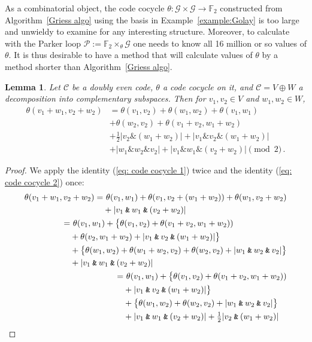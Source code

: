 \documentclass{article}
\theoremstyle{plain}
\newtheorem{lemma}{Lemma}
\theoremstyle{definition}
\def \cC {\mathcal{C}}
\def \cG {\mathcal{G}}
\def \cP {\mathcal{P}}
\def \FF {\mathbb{F}}
\newcommand{\AND}{\mathbin{\texttt{\&}}}
\def\And{\mathbin{\&}}
\def\Plus{+}
\begin{document}
As a combinatorial object, the code cocycle $\theta\colon \cG \times \cG\to \FF_2$ constructed from Algorithm~\ref{Griess algo} using the basis in Example~\ref{example:Golay} is too large and unwieldy to examine for any interesting structure. 
Moreover, to calculate with the Parker loop $\cP := \FF_2\times_\theta \cG$ one needs to know all 16 million or so values of $\theta$.
It is thus desirable to have a method that will calculate values of $\theta$ by a method shorter than Algorithm~\ref{Griess algo}.

\begin{lemma}\label{lemma:formula lemma}
Let $\cC$ be a doubly even code, $\theta$ a code cocycle on it, and $\cC = V\oplus W$ a decomposition into complementary subspaces.
Then for $v_1,v_2\in V$ and $w_1,w_2\in W$,
\begin{align}\label{eq:theformula}
	\theta(v_1\Plus w_1,v_2\Plus w_2)	
		& = \theta(v_1,v_2)  + \theta(w_1,w_2) + \theta(v_1,w_1) \\
		&+ \theta(w_2,v_2) + \theta(v_1\Plus v_2,w_1\Plus w_2) \nonumber \\
							& + \tfrac12|v_2\And(w_1\Plus w_2)| + |v_1\And v_2 \And (w_1\Plus w_2)| \nonumber \\
							&+|w_1\And w_2 \And v_2| + \left|v_1\And w_1 \And (v_2 \Plus  w_2)\right| \pmod 2\,. \nonumber
\end{align}
\end{lemma}

\begin{proof}
We apply the identity (\ref{eq: code cocycle 1}) twice and the identity (\ref{eq: code cocycle 2}) once:
\begin{align*}
\begin{split}
	\theta(v_1+w_1,v_2+w_2) =&\ \theta(v_1,w_1) + \theta(v_1,v_2+(w_1+w_2)) + \theta(w_1,v_2+w_2) \\
	&+ |v_1\AND w_1\AND(v_2+w_2)| 
\end{split}\\
\begin{split}
	 =&\ \theta(v_1,w_1) + \big\{ \theta(v_1,v_2) + \theta(v_1+v_2,w_1+w_2)) \\ 
	 & + \theta(v_2,w_1+w_2) + |v_1\AND v_2 \AND (w_1+w_2)| \big\} \\
	 & + \big\{\theta(w_1,w_2) + \theta(w_1+w_2,v_2) + \theta(w_2,v_2) + |w_1\AND w_2\AND v_2| \big\} \\
	 & + |v_1\AND w_1\AND(v_2+w_2)| 
\end{split}\\
\begin{split}
	 =&\ \theta(v_1,w_1) + \big\{ \theta(v_1,v_2) + \theta(v_1+v_2,w_1+w_2)) \\ 
	 & +  |v_1\AND v_2 \AND (w_1+w_2)| \big\} \\
	 & + \big\{\theta(w_1,w_2) + \theta(w_2,v_2) + |w_1\AND w_2\AND v_2| \big\} \\
	 & + |v_1\AND w_1\AND(v_2+w_2)| + \tfrac12|v_2\AND (w_1+w_2)| \qedhere
\end{split}
\end{align*}
\end{proof}
\end{document}
